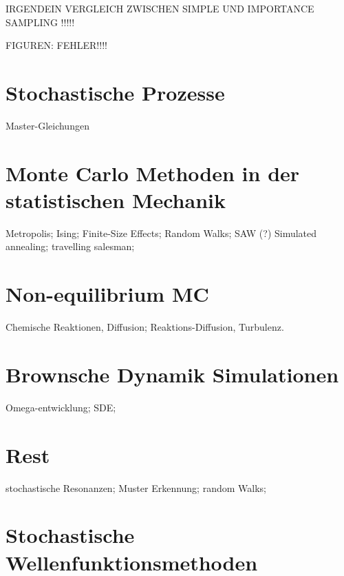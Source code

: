 IRGENDEIN VERGLEICH ZWISCHEN SIMPLE UND IMPORTANCE SAMPLING !!!!!


FIGUREN: FEHLER!!!!





\chapter{Stochastische Prozesse}
Master-Gleichungen

\chapter{Monte Carlo Methoden in der statistischen Mechanik}
Metropolis; Ising; Finite-Size Effects; Random Walks; SAW (?)
Simulated annealing; travelling salesman;

\chapter{Non-equilibrium MC}
Chemische Reaktionen, Diffusion; Reaktions-Diffusion, Turbulenz.

\chapter{Brownsche Dynamik Simulationen}
Omega-entwicklung; SDE;


\chapter{Rest}
stochastische Resonanzen; Muster Erkennung; random Walks;

\chapter{Stochastische Wellenfunktionsmethoden}
